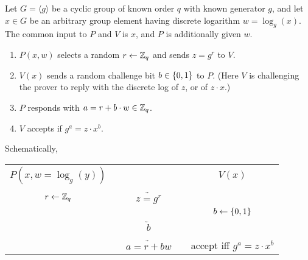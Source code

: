 \documentclass[11pt]{article}
\begin{document}
\begin{protocol}
  \label{prot:dlog}
  Let $G = \langle g \rangle$ be a cyclic group of known order $q$
  with known generator $g$, and let $x \in G$ be an arbitrary group
  element having discrete logarithm $w = \log_{g}(x)$.  The common
  input to $P$ and $V$ is $x$, and $P$ is additionally given $w$.
  \begin{enumerate}

  \item $P(x,w)$ selects a random $r \gets \mathbb{Z}_q$ and sends $z = g^{r}$
    to $V$.

  \item $V(x)$ sends a random challenge bit $b \in \{0,1\}$ to $P$.  (Here
    $V$ is challenging the prover to reply with the discrete log of $z$,
    or of $z \cdot x$.)

  \item $P$ responds with $a = r + b \cdot w \in \mathbb{Z}_q$.
    
  \item $V$ accepts if $g^{a} = z \cdot x^{b}$.

  \end{enumerate}
  Schematically,

  \begin{center}
    \begin{tabular}{ccc}
      $P(x,w = \log_{g}(y))$ & & $V(x)$ \\ \\
      $r \gets \mathbb{Z}_q$ & $\underrightarrow{\quad z = g^{r} \quad}$ & \\
      & & $b \gets \{0,1\}$ \\
      & $\underleftarrow{\quad b \quad}$ & \\
      & & \\
      & $\underrightarrow{\quad a = r + b w \quad}$ & accept iff
      $g^{a}=z\cdot x^{b}$
    \end{tabular}
  \end{center}
\end{protocol}
\end{document}
